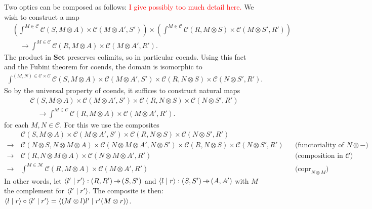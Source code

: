 \documentclass[11pt,a4paper]{article}
\theoremstyle{plain}
\theoremstyle{definition}
\newcommand{\C}{\mathscr{C}}
\newcommand{\M}{\mathscr{M}}
\newcommand{\Set}{\mathbf{Set}}
\DeclareMathOperator{\copr}{copr}
\newcommand{\rep}[2]{{\ensuremath \left\langle #1 \mid #2 \right\rangle}}
\newcommand{\hto}{\ensuremath{\,\mathaccent\shortmid\rightarrow\,}}
\newcommand{\todo}[1]{\textcolor{red}{\small #1}}
\begin{document}
Two optics can be composed as follows: \todo{I give possibly too much detail here.} We wish to construct a map
\begin{align*}
  &\left(\int^{M \in \C} \C(S, M \otimes A) \times \C(M \otimes A', S')\right) \times \left(\int^{M \in \C} \C(R, M \otimes S) \times \C(M \otimes S', R')\right) \\ &
                                                                                                                                                                       \quad \to \int^{M \in \C} \C(R, M \otimes A) \times \C(M \otimes A', R').
\end{align*}
The product in $\Set$ preserves colimits, so in particular coends. Using this fact and the Fubini theorem for coends, the domain is isomorphic to
\begin{align*}
  \int^{(M, N) \in \C \times \C} \C(S, M \otimes A) \times \C(M \otimes A', S') \times \C(R, N \otimes S) \times \C(N \otimes S', R').
\end{align*}
So by the universal property of coends, it suffices to construct natural maps
\begin{align*}
  & \C(S, M \otimes A) \times \C(M \otimes A', S') \times \C(R, N \otimes S) \times \C(N \otimes S', R') \\ &
                                                                                                              \quad \to \int^{M \in \C} \C(R, M \otimes A) \times \C(M \otimes A', R').
\end{align*}
for each $M, N \in \C$. For this we use the composites
\begin{align*}
  &\C(S, M \otimes A) \times \C(M \otimes A', S') \times \C(R, N \otimes S) \times \C(N \otimes S', R')\\
  \to \,& \C(N \otimes S, N \otimes M \otimes A) \times \C(N \otimes M \otimes A', N \otimes S') \times \C(R, N \otimes S) \times \C(N \otimes S', R') && \text{(functoriality of $N \otimes  -$)} \\
  \to \,& \C(R, N \otimes  M \otimes A) \times \C(N \otimes M \otimes A', R') && \text{(composition in $\C$)} \\
  \to \,&\int^{M \in \M} \C(R, M \otimes A) \times \C(M \otimes A', R') && \text{($\copr_{N \otimes M}$)}
\end{align*}
In other words, let $\rep{l'}{r'} : (R, R') \hto (S, S')$ and $\rep{l}{r} : (S, S') \hto (A, A')$ with $M$ the complement for $\rep{l'}{r'}$. The composite is then: $\rep{l}{r} \circ \rep{l'}{r'} = \rep{(M \otimes l)l'}{r'(M \otimes r)}$.
\end{document}
